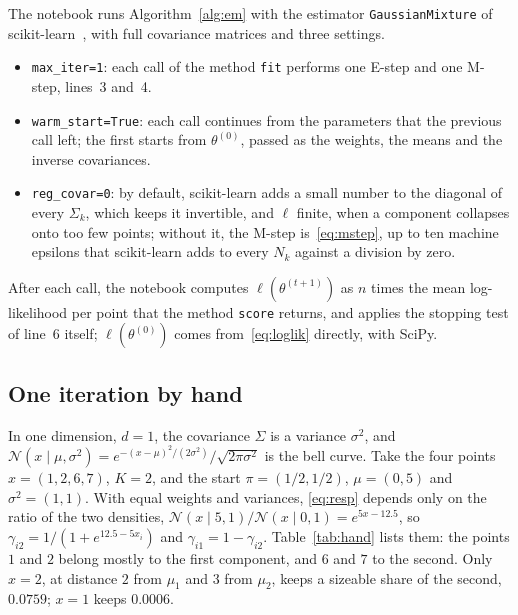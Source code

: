 \documentclass[11pt,a4paper]{amsart}
\numberwithin{equation}{section}
\theoremstyle{plain}
\theoremstyle{definition}
\theoremstyle{remark}
\newcommand{\N}{\mathcal{N}}
\newcommand{\given}{\mid}
\newcommand{\code}[1]{\texttt{#1}}
\begin{document}
The notebook runs Algorithm~\ref{alg:em} with the estimator
\code{GaussianMixture} of scikit-learn~\cite{pedregosa2011}, with full
covariance matrices and three settings.
\begin{itemize}[leftmargin=*, nosep]
\item \code{max\_iter=1}: each call of the method \code{fit} performs
  one E-step and one M-step, lines~3 and~4.
\item \code{warm\_start=True}: each call continues from the parameters
  that the previous call left; the first starts from $\theta^{(0)}$,
  passed as the weights, the means and the inverse covariances.
\item \code{reg\_covar=0}: by default, scikit-learn adds a small number
  to the diagonal of every $\Sigma_k$, which keeps it invertible, and
  $\ell$ finite, when a component collapses onto too few points; without
  it, the M-step is~\eqref{eq:mstep}, up to ten machine epsilons that
  scikit-learn adds to every $N_k$ against a division by zero.
\end{itemize}
After each call, the notebook computes $\ell(\theta^{(t+1)})$ as $n$
times the mean log-likelihood per point that the method \code{score}
returns, and applies the stopping test of line~6 itself;
$\ell(\theta^{(0)})$ comes from~\eqref{eq:loglik} directly, with SciPy.

\subsection{One iteration by hand}\label{sec:hand}

In one dimension, $d = 1$, the covariance $\Sigma$ is a variance
$\sigma^2$, and $\N(x \given \mu, \sigma^2) = e^{-(x - \mu)^2 /
(2\sigma^2)} / \sqrt{2\pi\sigma^2}$ is the bell curve. Take the four
points $x = (1, 2, 6, 7)$, $K = 2$, and the start $\pi = (1/2, 1/2)$,
$\mu = (0, 5)$ and $\sigma^2 = (1, 1)$. With equal weights and
variances, \eqref{eq:resp} depends only on the ratio of the two
densities,
${\N(x \given 5, 1) / \N(x \given 0, 1) = e^{5x - 12.5}}$, so
$\gamma_{i2} = 1/(1 + e^{12.5 - 5 x_i})$ and
$\gamma_{i1} = 1 - \gamma_{i2}$. Table~\ref{tab:hand} lists them: the
points $1$ and $2$ belong mostly to the first component, and $6$ and $7$
to the second. Only $x = 2$, at distance $2$ from $\mu_1$ and $3$ from
$\mu_2$, keeps a sizeable share of the second, $0.0759$; $x = 1$ keeps
$0.0006$.
\end{document}
